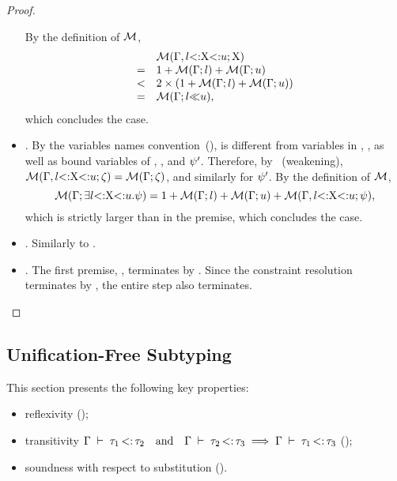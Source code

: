 \begin{proof}
\begin{itemize}
            By the definition of $\operatorname{\mathcal{M}}$,
            \[
                \begin{array}{cl}
                    & \operatorname{\mathcal{M}}(\Gamma, l{\operatorname{<:}}\mathrm{X}{\operatorname{<:}}u;\mathrm{X}) \\
                  = & 1 + \operatorname{\mathcal{M}}(\Gamma;l) + \operatorname{\mathcal{M}}(\Gamma;u) \\
                  < & 2\times(1 + \operatorname{\mathcal{M}}(\Gamma;l) + \operatorname{\mathcal{M}}(\Gamma;u)) \\
                  = & \operatorname{\mathcal{M}}(\Gamma;l{\operatorname{\ll}}u),
                \end{array}
            \]
            which concludes the case.
        \item {}. By the variables names
            convention~(), \vx is different from variables
            in \AEnv, \UEnv, as well as bound variables of \dctxsig, \tysig,
            and $\psi'$. Therefore, by~ (weakening),
            $\operatorname{\mathcal{M}}(\Gamma, l{\operatorname{<:}}\mathrm{X}{\operatorname{<:}}u;\zeta) = 
            \operatorname{\mathcal{M}}(\Gamma;\zeta)$, and similarly for $\psi'$.
            By the definition of $\operatorname{\mathcal{M}}$,
            \[\operatorname{\mathcal{M}}(\Gamma;\exists l{\operatorname{<:}}\mathrm{X}{\operatorname{<:}}u.\psi) = 1 +
                \operatorname{\mathcal{M}}(\Gamma;l) + \operatorname{\mathcal{M}}(\Gamma;u) + 
                \operatorname{\mathcal{M}}(\Gamma, l{\operatorname{<:}}\mathrm{X}{\operatorname{<:}}u;\psi),\]
            which is strictly larger than
            \tymsr{\AEnv, \varbound{\vx}{\tylb}{\tyub}}{\tysig} in the premise,
            which concludes the case.
        \item {}. Similarly to .
        \item {}. The first premise,
            ,
            terminates by .
            Since the constraint resolution \solvectrdflt terminates
            by , the entire step also terminates.
    \end{itemize}
\end{proof}


\subsection{Unification-Free Subtyping}%
\label{subsec:props-subty-proof}

This section presents the following key properties:
\begin{itemize}
    \item reflexivity \subtydflt{\ty}{\ty} ();
    \item transitivity $\subtydflt{\ty_1}{\ty_2} \ \ \text{ and }\ \ 
        \subtydflt{\ty_2}{\ty_3} \implies \subtydflt{\ty_1}{\ty_3}$
        (\thmref{thm:sub-ty-trans});
    \item soundness with respect to substitution ().
\end{itemize}

